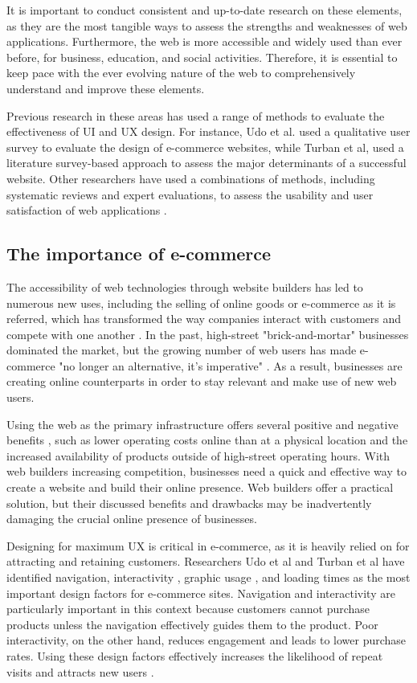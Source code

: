 \documentclass[article]{IEEEtran}
\begin{document}
        It is important to conduct consistent and up-to-date research on these elements, as they are the most tangible ways to assess the strengths and weaknesses of web applications. Furthermore, the web is more accessible and widely used than ever before, for business, education, and social activities. Therefore, it is essential to keep pace with the ever evolving nature of the web to comprehensively understand and improve these elements.
        
        Previous research in these areas has used a range of methods to evaluate the effectiveness of UI and UX design. For instance, Udo et al. \cite{udo} used a qualitative user survey to evaluate the design of e-commerce websites, while Turban et al, \cite{turban} used a literature survey-based approach to assess the major determinants of a successful website. Other researchers have used a combinations of methods, including systematic reviews and expert evaluations, to assess the usability and user satisfaction of web applications \cite{sudiana}.
        
        \subsection{The importance of e-commerce}
            The accessibility of web technologies through website builders has led to numerous new uses, including the selling of online goods or e-commerce as it is referred, which has transformed the way companies interact with customers and compete with one another \cite{slywotzky}. In the past, high-street "brick-and-mortar" businesses dominated the market, but the growing number of web users has made e-commerce "no longer an alternative, it's imperative" \cite{ngamba}. As a result, businesses are creating online counterparts \cite{ullah} in order to stay relevant and make use of new web users.
            
            Using the web as the primary infrastructure offers several positive and negative benefits \cite{kim}, such as lower operating costs online than at a physical location and the increased availability of products outside of high-street operating hours. With web builders increasing competition, businesses need a quick and effective way to create a website and build their online presence. Web builders offer a practical solution, but their discussed benefits and drawbacks may be inadvertently damaging the crucial online presence of businesses.
            
            Designing for maximum UX is critical in e-commerce, as it is heavily relied on for attracting and retaining customers. Researchers Udo et al \cite{udo} and Turban et al have identified navigation, interactivity \cite{udo, turban}, graphic usage \cite{udo}, and loading times \cite{turban} as the most important design factors for e-commerce sites. Navigation and interactivity are particularly important in this context because customers cannot purchase products unless the navigation effectively guides them to the product. Poor interactivity, on the other hand, reduces engagement and leads to lower purchase rates. Using these design factors effectively increases the likelihood of repeat visits and attracts new users \cite{udo}.
            
\end{document}
